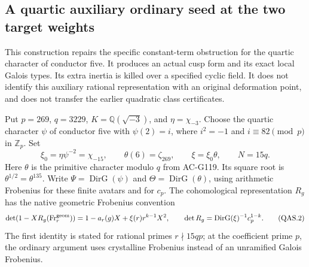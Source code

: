 \subsection{A quartic auxiliary ordinary seed at the two target weights}
\label{sec:quartic-auxiliary-seed-research}

This construction repairs the specific constant-term obstruction for
the quartic character of conductor five.  It produces an actual cusp
form and its exact local Galois types.  Its extra inertia is killed
over a specified cyclic field.  It does not identify this auxiliary
rational representation with an original deformation point, and
does not transfer the earlier quadratic class certificates.

Put \(p=269\), \(q=3229\), \(K=\mathbb Q(\sqrt{-3})\), and
\(\eta=\chi_{-3}\).  Choose the quartic character \(\psi\) of
conductor five with \(\psi(2)=i\), where \(i^2=-1\) and
\(i\equiv82\pmod p\) in \(\mathbb Z_p\).  Set
\[
 \xi_0=\eta\psi^{-2}=\chi_{-15},\qquad
 \theta(6)=\zeta_{269},\qquad
 \xi=\xi_0\theta,\qquad N=15q.
 \tag{QAS.1}
\]
Here \(\theta\) is the primitive character modulo \(q\) from
AC-G119.  Its square root is \(\theta^{1/2}=\theta^{135}\).
Write \(\Psi=\operatorname{DirG}(\psi)\) and
\(\Theta=\operatorname{DirG}(\theta)\), using arithmetic
Frobenius for these finite avatars and for \(c_p\).
The cohomological representation \(R_g\) has the native geometric
Frobenius convention
\[
 \det(1-XR_g(\operatorname{Fr}^{\rm geom}_r))
   =1-a_r(g)X+\xi(r)r^{k-1}X^2,
 \qquad \det R_g=\operatorname{DirG}(\xi)^{-1}c_p^{1-k}.
 \tag{QAS.2}
\]
The first identity is stated for rational primes \(r\nmid15qp\);
at the coefficient prime \(p\), the ordinary argument uses
crystalline Frobenius instead of an unramified Galois Frobenius.

